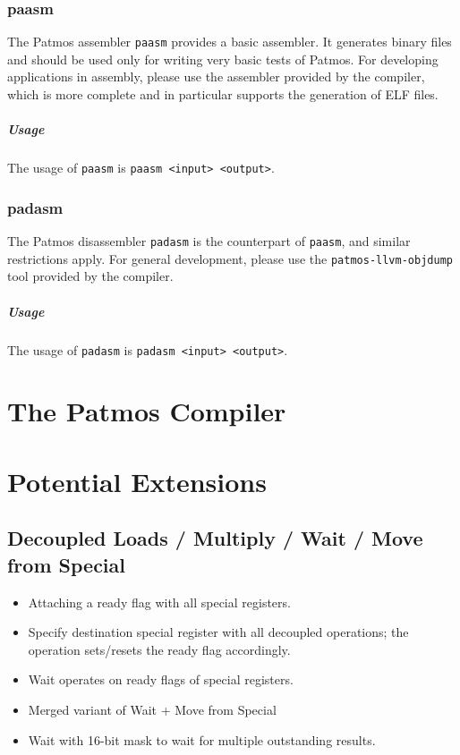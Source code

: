 \documentclass[a4paper,fontsize=10pt,twoside,DIV15,BCOR12mm,headinclude=true,footinclude=false,pagesize,bibtotoc]{scrbook}
\begin{document}
\subsection{paasm}

The Patmos assembler \texttt{paasm} provides a basic assembler. It
generates binary files and should be used only for writing very basic
tests of Patmos. For developing applications in assembly, please use
the assembler provided by the compiler, which is more complete and in
particular supports the generation of ELF files.

\paragraph{Usage}

The usage of \texttt{paasm} is \texttt{paasm <input> <output>}.

\subsection{padasm}

The Patmos disassembler \texttt{padasm} is the counterpart of
\texttt{paasm}, and similar restrictions apply. For general
development, please use the \texttt{patmos-llvm-objdump} tool provided
by the compiler.

\paragraph{Usage}

The usage of \texttt{padasm} is \texttt{padasm <input> <output>}.

\chapter{The Patmos Compiler}
\label{sec:compiler}




\chapter{Potential Extensions}

\section{Decoupled Loads / Multiply / Wait / Move from Special}

\begin{itemize}
  \item Attaching a ready flag with all special registers.
  \item Specify destination special register with all decoupled operations; the
        operation sets/resets the ready flag accordingly.
  \item Wait operates on ready flags of special registers.
  \item Merged variant of Wait + Move from Special
  \item Wait with 16-bit mask to wait for multiple outstanding results.
\end{itemize}
\end{document}
